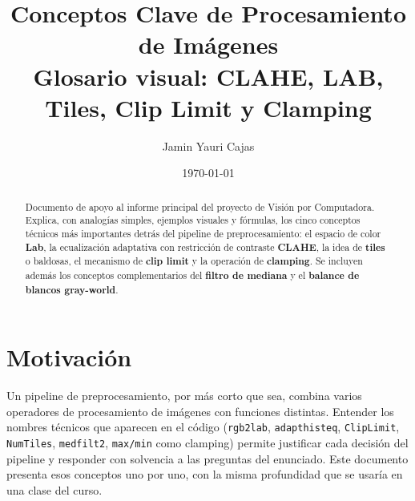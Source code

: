 \documentclass[11pt,a4paper]{article}
\title{
    \vspace{-1.5cm}
    \textbf{Conceptos Clave de Procesamiento de Imágenes} \\[0.3cm]
    \Large Glosario visual: CLAHE, LAB, Tiles, Clip Limit y Clamping
}
\author{Jamin Yauri Cajas}
\date{\today}
\begin{document}
\maketitle

\begin{abstract}
\noindent
Documento de apoyo al informe principal del proyecto de Visión por Computadora.
Explica, con analogías simples, ejemplos visuales y fórmulas, los cinco conceptos
técnicos más importantes detrás del pipeline de preprocesamiento: el espacio de
color \textbf{Lab}, la ecualización adaptativa con restricción de contraste
\textbf{CLAHE}, la idea de \textbf{tiles} o baldosas, el mecanismo de
\textbf{clip limit} y la operación de \textbf{clamping}. Se incluyen además los
conceptos complementarios del \textbf{filtro de mediana} y el \textbf{balance de
blancos gray-world}.
\end{abstract}

\tableofcontents
\vspace{1cm}

\section{Motivación}

Un pipeline de preprocesamiento, por más corto que sea, combina varios operadores
de procesamiento de imágenes con funciones distintas. Entender los nombres técnicos
que aparecen en el código (\texttt{rgb2lab}, \texttt{adapthisteq},
\texttt{ClipLimit}, \texttt{NumTiles}, \texttt{medfilt2}, \texttt{max/min} como
clamping) permite justificar cada decisión del pipeline y responder con solvencia
a las preguntas del enunciado. Este documento presenta esos conceptos uno por
uno, con la misma profundidad que se usaría en una clase del curso.

\end{document}
